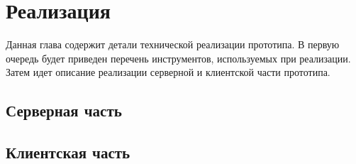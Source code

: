 ﻿\section{Реализация}

Данная глава содержит  детали технической реализации прототипа.
В первую очередь будет приведен перечень инструментов,
используемых при реализации.
Затем идет описание реализации серверной и клиентской части прототипа.



\subsection{Серверная часть}
\lipsum[5]

\subsection{Клиентская часть}
\lipsum[6]